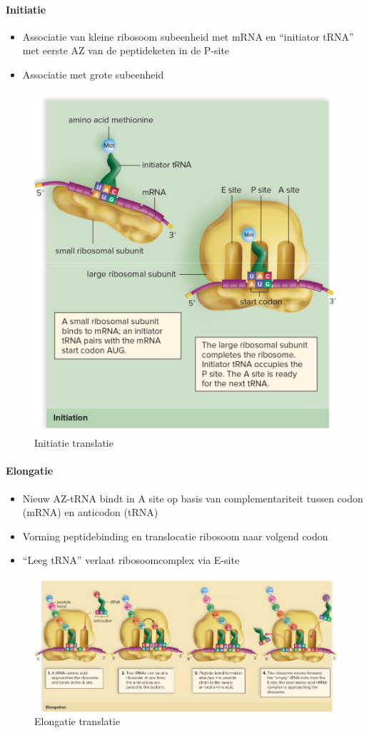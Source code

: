 \documentclass[a4paper,kul]{kulakarticle} %
\begin{document}
\paragraph{Initiatie}
\begin{itemize}
	\item Associatie van kleine ribosoom subeenheid met mRNA en “initiator tRNA” met eerste AZ van de peptideketen in de P-site
	\item Associatie met grote subeenheid
\end{itemize}
\begin{figure}[h]
	\centering
	\includegraphics[width=0.7\linewidth]{TranslatieInitiatie}
	\caption[Initiatie translatie]{Initiatie translatie}
	\label{fig:translatieinitiatie}
\end{figure}
\newpage
\paragraph{Elongatie}
\begin{itemize}
	\item Nieuw AZ-tRNA bindt in A site op basis van complementariteit tussen codon (mRNA) en anticodon (tRNA)
	\item Vorming peptidebinding en translocatie ribosoom naar volgend codon
	\item “Leeg tRNA” verlaat ribosoomcomplex via E-site
\end{itemize}
\begin{figure}[h]
	\centering
	\includegraphics[width=0.7\linewidth]{TranslatieElongatie}
	\caption[Elongatie translatie]{Elongatie translatie}
	\label{fig:translatieelongatie}
\end{figure}
\end{document}
